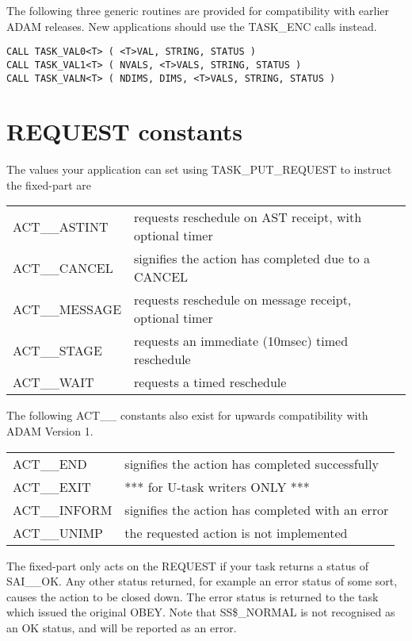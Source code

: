 The following three generic routines are provided for compatibility with 
earlier ADAM releases. New applications should use the TASK\_ENC calls 
instead.

\begin{verbatim}
CALL TASK_VAL0<T> ( <T>VAL, STRING, STATUS )
CALL TASK_VAL1<T> ( NVALS, <T>VALS, STRING, STATUS )
CALL TASK_VALN<T> ( NDIMS, DIMS, <T>VALS, STRING, STATUS )
\end{verbatim}

\newpage
\section{REQUEST constants}

The values your application can set using TASK\_PUT\_REQUEST to instruct
the fixed-part are 

\begin{center}
\begin{tabular}{ll}
ACT\_\_ASTINT   &   requests reschedule on AST receipt, with optional timer \\
ACT\_\_CANCEL   &   signifies the action has completed due to a CANCEL \\
ACT\_\_MESSAGE  &   requests reschedule on message receipt, optional timer \\
ACT\_\_STAGE    &   requests an immediate (10msec) timed reschedule \\
ACT\_\_WAIT     &   requests a timed reschedule \\
\end{tabular}
\end{center}

The following ACT\_\_ constants also exist for upwards compatibility 
with ADAM Version 1.
\begin{center}
\begin{tabular}{ll}
ACT\_\_END      &   signifies the action has completed successfully \\
ACT\_\_EXIT     &   *** for U-task writers ONLY *** \\
ACT\_\_INFORM   &   signifies the action has completed with an error \\
ACT\_\_UNIMP    &   the requested action is not implemented \\
\end{tabular}
\end{center}

The fixed-part only acts on the REQUEST if your task returns a status of 
SAI\_\_OK. Any other status returned, for example an error status of
some sort, causes the action to be closed down. The error status is
returned to the task which issued the original OBEY. Note that
SS\$\_NORMAL is not recognised as an OK status, and will be reported as 
an error.

